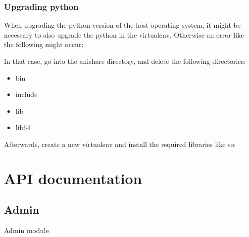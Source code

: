 \documentclass[letterpaper,10pt,openany,oneside,english]{sphinxmanual}
\begin{document}
\subsection{Upgrading python}
\label{\detokenize{index:upgrading-python}}
When upgrading the python version of the host operating system, it might be necessary to also
upgrade the python in the virtualenv. Otherwise an error like the following might occur:
\begin{quote}

\end{quote}

In that case, go into the anishare directory, and delete the following directories:
\begin{itemize}
\item {} 
bin

\item {} 
include

\item {} 
lib

\item {} 
lib64

\end{itemize}

Afterwards, create a new virtualenv and install the required libraries like so:

%
\begin{sphinxVerbatim}[commandchars=\\\{\}]
   
 
   
\end{sphinxVerbatim}


\chapter{API documentation}
\label{\detokenize{index:api-documentation}}

\section{Admin}
\label{\detokenize{index:module-animals.admin}}\label{\detokenize{index:admin}}
Admin module
\end{document}
